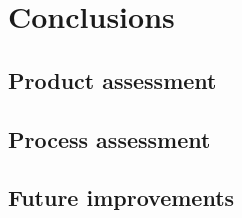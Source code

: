 \chapter{Conclusions}

\section{Product assessment}

\section{Process assessment}

\section{Future improvements}
